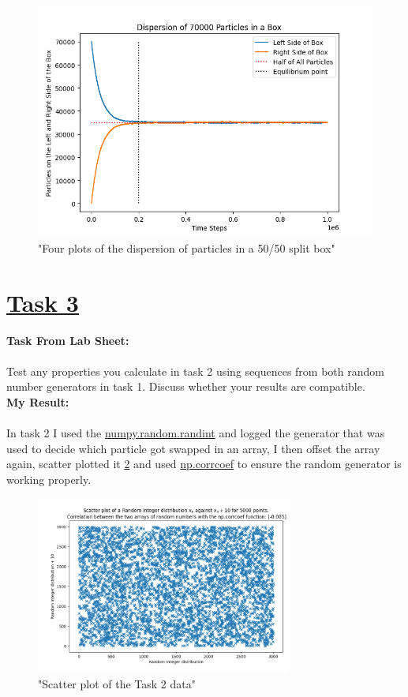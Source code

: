 \documentclass[12pt, A4]{article}
\begin{document}
\begin{figure}[h]
    \includegraphics[scale=0.50]{Task_2_Line_70000}
    \caption{"Four plots of the dispersion of particles in a 50/50 split box"}\label{fig2}
\end{figure}


\section*{\underline{Task 3}}
\textbf{Task From Lab Sheet:} \\ \\ Test any properties you calculate in task 2 using sequences from both random number generators in task 1. Discuss whether your results are compatible.
\vspace{1.5em}\\
\textbf{My Result:} \\ \\ In task 2 I used the \href{https://numpy.org/doc/stable/reference/random/generated/numpy.random.randint.html}{numpy.random.randint} and logged the generator that was used to decide which particle got swapped in an array, I then offset the array again, scatter plotted it \ref{fig3} and used \href{"https://numpy.org/doc/stable/reference/generated/numpy.corrcoef.html"}{np.corrcoef} to ensure the random generator is working properly.
\begin{figure}[h]
  \begin{center}
    \includegraphics[width=0.75\textwidth]{Task_2_Scatter}
  \end{center}
  \caption{"Scatter plot of the Task 2 data"}
  \label{fig3}
\end{figure}
\end{document}

